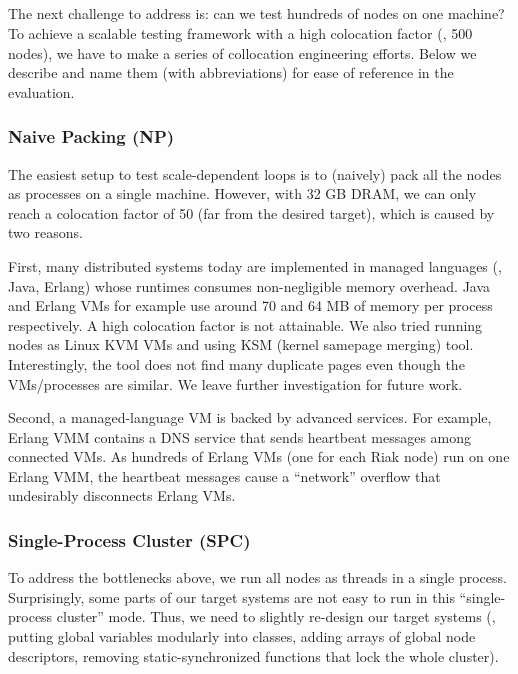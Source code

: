 

\subsection{\stest}
\label{sc-test}



The next challenge to address is: can we test hundreds of nodes on one
machine?  To achieve a scalable testing framework with a high colocation
factor (\eg, 500 nodes), we have to make a series of collocation
engineering efforts.  Below we describe and name them (with abbreviations)
for ease of reference in the evaluation.

\subsubsection{Naive Packing (NP)}
\label{sc-np}

The easiest setup to test scale-dependent loops is to (naively) pack all
the nodes as processes on a single machine.  However, with 32 GB DRAM, we
can only reach  a colocation factor of 50 (far from the desired target),
which is caused by two reasons.

First, many distributed systems today are implemented in managed languages
(\eg, Java, Erlang) whose runtimes consumes non-negligible memory overhead.
Java and Erlang VMs for example use around 70 and 64 MB of memory per
process respectively.  A high colocation factor is not attainable.
%
We also tried running nodes as Linux KVM VMs and using KSM (kernel
samepage merging) tool.  Interestingly, the tool does not find many
duplicate pages even though the VMs/processes are similar.  We leave further
investigation for future work.

Second, a managed-language VM is backed by advanced services.  For
example, Erlang VMM contains a DNS service that sends heartbeat messages
among connected VMs.  As hundreds of Erlang VMs (one for each Riak node)
run on one Erlang VMM, the heartbeat messages cause a ``network'' overflow
that undesirably disconnects Erlang VMs.


\subsubsection{Single-Process Cluster (SPC)}
\label{sc-spc}

To address the bottlenecks above, we run all nodes as threads in a single
process.  Surprisingly, some parts of our target systems are not easy to
run in this ``single-process cluster'' mode.  Thus, we need to slightly
re-design our target systems (\eg, putting global variables modularly into
classes, adding arrays of global node descriptors, removing
static-synchronized functions that lock the whole cluster).



